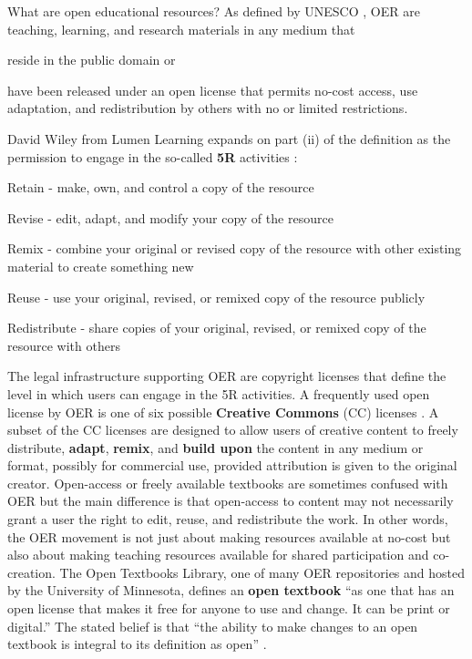 \documentclass[11pt]{article}
\begin{document}
What are open educational resources?  As defined by UNESCO \cite{oerworldcongress}, OER are teaching, learning, and research materials in any medium that
\begin{compactenum}[(i)]
\item reside in the public domain or
\item have been released under an open license that permits no-cost access, use adaptation, and redistribution by others with no or limited restrictions.
\end{compactenum}
David Wiley from Lumen Learning expands on part (ii) of the definition as the permission to engage in the so-called \textbf{5R} activities \cite{wileynd}:
\begin{compactenum}[(i)]
  \item Retain - make, own, and control a copy of the resource
  \item Revise - edit, adapt, and modify your copy of the resource
  \item Remix - combine your original or revised copy of the resource with other existing material to create something new
  \item Reuse - use your original, revised, or remixed copy of the resource publicly
  \item Redistribute - share copies of your original, revised, or remixed copy of the resource with others
\end{compactenum}

The legal infrastructure supporting OER are copyright licenses that define the level in which users can engage in the 5R activities.  A frequently used open license by OER is one of six possible \textbf{Creative Commons} (CC) licenses \cite{CClicenses:nd}.  A subset of the CC licenses are designed to allow users of creative content to freely distribute, \textbf{adapt}, \textbf{remix}, and \textbf{build upon} the content in any medium or format, possibly for commercial use, provided attribution is given to the original creator.  Open-access or freely available textbooks are sometimes confused with OER but the main difference is that open-access to content may not necessarily grant a user the right to edit, reuse, and redistribute the work.  In other words, the OER movement is not just about making resources available at no-cost but also about making teaching resources available for shared participation and co-creation.  The Open Textbooks Library, one of many OER repositories and hosted by the University of Minnesota, defines an \textbf{open textbook} ``as one that has an open license that makes it free for anyone to use and change. It can be print or digital.''  The stated belief is that ``the ability to make changes to an open textbook is integral to its definition as open'' \cite{opentextbooksfaq:nd}.
\end{document}

